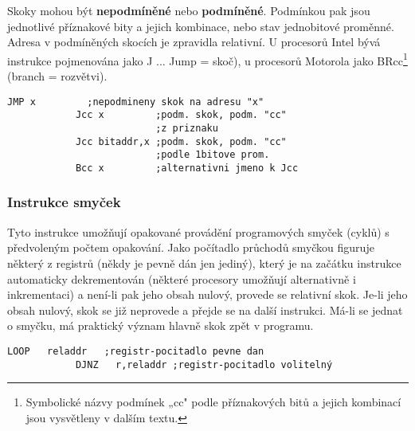           Skoky mohou být \textbf{nepodmíněné} nebo \textbf{podmíněné}. Podmínkou pak jsou 
          jednotlivé příznakové bity a jejich kombinace, nebo stav jednobitové proměnné. Adresa v 
          podmíněných skocích je zpravidla relativní. U procesorů Intel bývá instrukce pojmenována 
          jako J ... Jump = skoč), u procesorů Motorola jako BRcc\footnote{Symbolické názvy 
          podmínek „cc" podle příznakových bitů a jejich kombinací jsou vysvětleny v dalším textu.} 
          (branch = rozvětvi).
          \begin{lstlisting}[gobble=10]
            JMP x         ;nepodmineny skok na adresu "x"
            Jcc x         ;podm. skok, podm. "cc" 
                          ;z priznaku 
            Jcc bitaddr,x ;podm. skok, podm. "cc" 
                          ;podle 1bitove prom.
            Bcc x         ;alternativni jmeno k Jcc
          \end{lstlisting}
          
        \subsubsection{Instrukce smyček}
          Tyto instrukce umožňují opakované provádění programových smyček (cyklů) s předvoleným 
          počtem opakování. Jako počítadlo průchodů smyčkou figuruje některý z registrů (někdy je 
          pevně dán jen jediný), který je na začátku instrukce automaticky dekrementován 
          (některé procesory umožňují alternativně i inkrementaci) a není-li pak jeho obsah nulový, 
          provede se relativní skok. Je-li jeho obsah nulový, skok se již neprovede a přejde se na 
          další instrukci. Má-li se jednat o smyčku, má praktický význam hlavně skok zpět v 
          programu.
          \begin{lstlisting}[gobble=10]
            LOOP   reladdr   ;registr-pocitadlo pevne dan 
            DJNZ   r,reladdr ;registr-pocitadlo volitelný
          \end{lstlisting}
          
